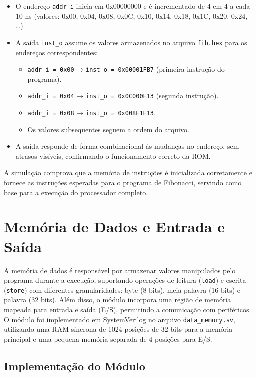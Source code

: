 \documentclass[
	12pt,				%
	oneside,
	a4paper,			%
	english,			%
	french,				%
	spanish,			%
	brazil,				%
	]{abntex2}
\begin{document}
\begin{itemize}
  \item O endereço \texttt{addr\_i} inicia em 0x00000000 e é incrementado de 4 em 4 a cada 10 ns (valores: 0x00, 0x04, 0x08, 0x0C, 0x10, 0x14, 0x18, 0x1C, 0x20, 0x24, …).
  \item A saída \texttt{inst\_o} assume os valores armazenados no arquivo \texttt{fib.hex} para os endereços correspondentes:
  \begin{itemize}
    \item \texttt{addr\_i = 0x00} → \texttt{inst\_o = 0x00001FB7} (primeira instrução do programa).
    \item \texttt{addr\_i = 0x04} → \texttt{inst\_o = 0x0C000E13} (segunda instrução).
    \item \texttt{addr\_i = 0x08} → \texttt{inst\_o = 0x008E1E13}.
    \item Os valores subsequentes seguem a ordem do arquivo.
  \end{itemize}
  \item A saída responde de forma combinacional às mudanças no endereço, sem atrasos visíveis, confirmando o funcionamento correto da ROM.
\end{itemize}

A simulação comprova que a memória de instruções é inicializada corretamente e fornece as instruções esperadas para o programa de Fibonacci, servindo como base para a execução do processador completo.

\section{Memória de Dados e Entrada e Saída}

A memória de dados é responsável por armazenar valores manipulados pelo programa durante a execução, suportando operações de leitura (\texttt{load}) e escrita (\texttt{store}) com diferentes granularidades: byte (8 bits), meia palavra (16 bits) e palavra (32 bits). Além disso, o módulo incorpora uma região de memória mapeada para entrada e saída (E/S), permitindo a comunicação com periféricos. O módulo foi implementado em SystemVerilog no arquivo \texttt{data\_memory.sv}, utilizando uma RAM síncrona de 1024 posições de 32 bits para a memória principal e uma pequena memória separada de 4 posições para E/S.

\subsection{Implementação do Módulo}
\end{document}
